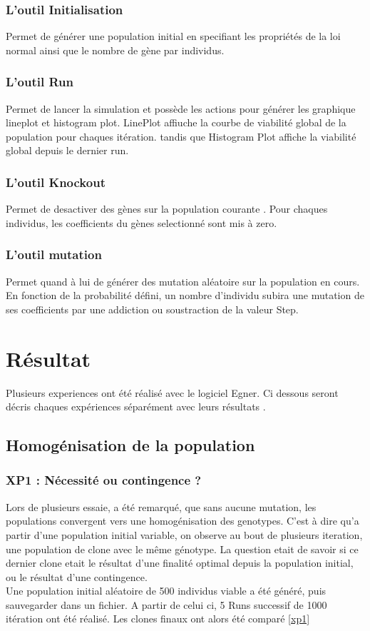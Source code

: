 \documentclass{article}
\begin{document}
	\subsubsection {L'outil Initialisation}
	Permet de générer une population initial en specifiant les propriétés de la loi normal ainsi que le nombre de gène par individus.
	\subsubsection{ L'outil Run}
	Permet de lancer la simulation et possède les actions pour générer les graphique lineplot et histogram plot. LinePlot affiuche la courbe de viabilité global de la population pour chaques itération. tandis que Histogram Plot affiche la viabilité global depuis le dernier run. 
	\subsubsection{L'outil Knockout}
	Permet de desactiver des gènes sur la population courante . Pour chaques individus, les coefficients du gènes selectionné sont mis à zero. 
	\subsubsection{L'outil mutation}
	Permet quand à lui de générer des mutation aléatoire sur la population en cours. En fonction de la probabilité défini, un nombre d'individu subira une mutation de ses coefficients par une addiction ou soustraction de la valeur Step.

	


	\section {Résultat}
	Plusieurs experiences ont été réalisé avec le logiciel Egner. Ci dessous seront décris chaques expériences séparément avec leurs résultats .

	\subsection{Homogénisation de la population}
	\subsubsection{XP1 : Nécessité ou contingence ?}
	Lors de plusieurs essaie, a été remarqué, que sans aucune mutation, les populations convergent vers une homogénisation des genotypes. C'est à dire qu'a partir d'une population initial variable, on observe au bout de plusieurs iteration, une population de clone avec le même génotype. La question etait de savoir si ce dernier clone etait le résultat d'une finalité optimal depuis la population initial, ou le résultat d'une contingence. \\
	Une population initial aléatoire de 500 individus viable a   été généré, puis sauvegarder dans un fichier. A partir de celui ci, 5 Runs successif de 1000 itération ont été réalisé. Les clones finaux ont alors été comparé \ref{xp1}
\end{document}
